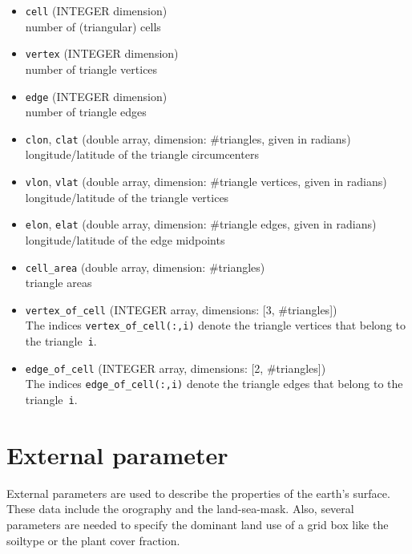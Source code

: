 \begin{itemize}
 \item \texttt{cell} (INTEGER dimension) \\
        number of (triangular) cells
 \item \texttt{vertex} (INTEGER dimension) \\
        number of triangle vertices
 \item \texttt{edge} (INTEGER dimension) \\
        number of triangle edges
 \item \texttt{clon}, \texttt{clat} (double array, dimension: \#triangles, given in radians) \\
        longitude/latitude of the triangle circumcenters
 \item \texttt{vlon}, \texttt{vlat} (double array, dimension: \#triangle vertices, given in radians) \\
        longitude/latitude of the triangle vertices
 \item \texttt{elon}, \texttt{elat} (double array, dimension: \#triangle edges, given in radians) \\
       longitude/latitude of the edge midpoints
 \item \texttt{cell\_area} (double array, dimension: \#triangles) \\
       triangle areas
 \item \texttt{vertex\_of\_cell} (INTEGER array, dimensions: [3, \#triangles]) \\
       The indices \texttt{vertex\_of\_cell(:,i)} denote the triangle vertices that belong 
       to the triangle~\texttt{i}.
 \item \texttt{edge\_of\_cell} (INTEGER array, dimensions: [2, \#triangles]) \\
       The indices \texttt{edge\_of\_cell(:,i)} denote the triangle edges that belong
       to the triangle~\texttt{i}.
\end{itemize}



\section{External parameter}
External parameters are used to describe the properties of the earth's surface. 
These data include the orography and the land-sea-mask. Also, several parameters
are needed to specify the dominant land use of a grid box like the soiltype
or the plant cover fraction.

